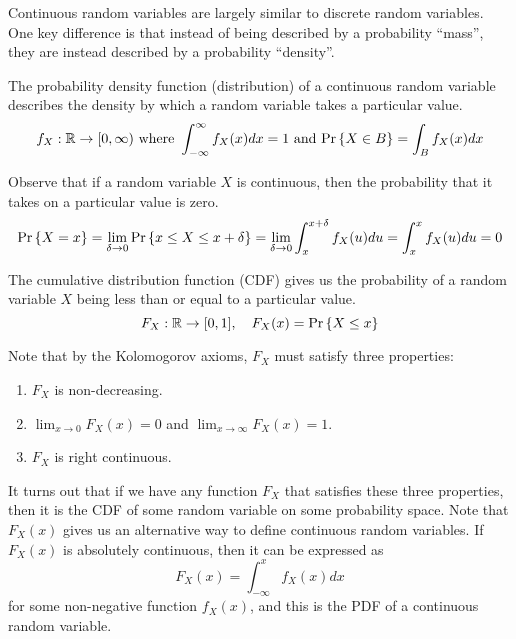 Continuous random variables are largely similar to discrete random variables.
One key difference is that instead of being described by a probability ``mass'', they are instead described by a probability ``density''.
\begin{definition}
  The probability density function (distribution) of a continuous random variable describes the density by which a random variable takes a particular value.
  \[
	f_X: \mathbb{R}\to [0, \infty) \text{ where } \int_{-\infty}^{\infty}f_X(x)dx = 1 \text{ and } \text{Pr}\left\{X\in B\right\} = \int_B f_X(x)dx
  \]
  \label{defn:pdf}
\end{definition}
Observe that if a random variable $X$ is continuous, then the probability that it takes on a particular value is zero.
\[
  \text{Pr}\left\{X=x\right\} = \lim_{\delta\to0} \text{Pr}\left\{x \leq X \leq x +\delta\right\} = \lim_{\delta\to 0}\int_x^{x+\delta}f_X(u)du = \int_{x}^{x}f_X(u)du = 0
\]
\begin{definition}
  The cumulative distribution function (CDF) gives us the probability of a random variable $X$ being less than or equal to a particular value.
  \[
	F_X:\mathbb{R} \to [0, 1],\quad F_X(x) = \text{Pr}\left\{X \leq x\right\}
  \]
  \label{defn:cdf}
\end{definition}
Note that by the Kolomogorov axioms, $F_X$ must satisfy three properties:
\begin{enumerate}
  \item $F_X$ is non-decreasing.
  \item $\lim_{x\to0} F_X(x) = 0$ and $\lim_{x\to\infty} F_X(x) = 1$.
  \item $F_X$ is right continuous.
\end{enumerate}
It turns out that if we have any function $F_X$ that satisfies these three properties, then it is the CDF of some random variable on some probability space.
Note that $F_X(x)$ gives us an alternative way to define continuous random variables.
If $F_X(x)$ is absolutely continuous, then it can be expressed as
\[
  F_X(x) = \int_{-\infty}^{x}f_X(x)dx
\]
for some non-negative function $f_X(x)$, and this is the PDF of a continuous random variable.

